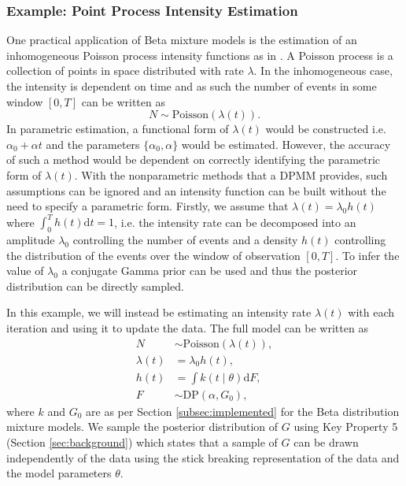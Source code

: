 \documentclass[nojss]{jss}
\begin{document}
\subsubsection{Example: Point Process Intensity Estimation}
One practical application of Beta mixture models is the estimation of an inhomogeneous Poisson process intensity functions as in \cite{taddy_mixture_2012}. A Poisson process is a collection of points in space distributed with rate $\lambda$. In the inhomogeneous case, the intensity is dependent on time and as such the number of events in some window $\left[0 , T\right]$ can be written as
\begin{equation*}
N \sim \text{Poisson} (\lambda (t) ).
\end{equation*}
In parametric estimation, a functional form of $\lambda (t)$ would be constructed i.e. $\alpha _0 + \alpha t$ and the parameters $\{\alpha _0, \alpha \}$ would be estimated. However, the accuracy of such a method would be dependent on correctly identifying the parametric form of $\lambda (t)$. With the nonparametric methods that a DPMM provides, such assumptions can be ignored and an intensity function can be built without the need to specify a parametric form. Firstly, we assume that $\lambda (t) = \lambda _0 h(t)$ where $\int _0 ^T h(t) \mathrm{d} t = 1$, i.e. the intensity rate can be decomposed into an amplitude $\lambda _0$ controlling the number of events and a density $h(t)$ controlling the distribution of the events over the window of observation $\left[0 , T\right]$. To infer the value of $\lambda _0$ a conjugate Gamma prior can be used and thus the posterior distribution can be directly sampled.

In this example, we will instead be estimating an intensity rate $\lambda (t)$ with each iteration and using it to update the data. The full model can be written as
\begin{align*}
N & \sim \text{Poisson} ( \lambda (t) ), \\
\lambda (t) & = \lambda _0 h(t), \\
h (t) & = \int k(t \mid \theta) \mathrm{d}F, \\
F & \sim \text{DP} (\alpha , G_0),
\end{align*}
where $k$ and $G_0$ are as per Section \ref{subsec:implemented} for the Beta distribution mixture models. We sample the posterior distribution of $G$ using Key Property 5 (Section \ref{sec:background}) which states that a sample of $G$ can be drawn independently of the data using the stick breaking representation of the data and the model parameters $\theta$.
\end{document}
